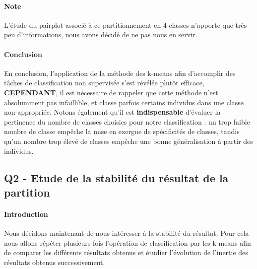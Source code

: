 \documentclass{report}
\begin{document}
\paragraph{Note}
L'étude du pairplot associé à ce partitionnement en 4 classes n'apporte que très peu d'informations, nous avons décidé de ne pas nous en servir.
\paragraph{Conclusion}
En conclusion, l'application de la méthode des k-means afin d'accomplir des tâches de classification non supervisée s'est révélée plutôt efficace, \textbf{CEPENDANT}, il est nécessaire de rappeler que cette méthode n'est absolumment pas infaillible, et classe parfois certains individus dans une classe non-appropriée. Notons également qu'il est \textbf{indispensable} d'évaluer la pertinence du nombre de classes choisies pour notre classification : un trop faible nombre de classe empêche la mise en exergue de spécificités de classes, tandis qu'un nombre trop élevé de classes empêche une bonne généralisation à partir des individus.
\newpage
\subsection{Q2 - Etude de la stabilité du résultat de la partition}
\paragraph{Introduction}
Nous décidons maintenant de nous intéresser à la stabilité du résultat. Pour cela nous allons répéter plusieurs fois l'opération de classification par les k-means afin de comparer les différents résultats obtenus et étudier l'évolution de l'inertie des résultats obtenus successivement.
\end{document}
